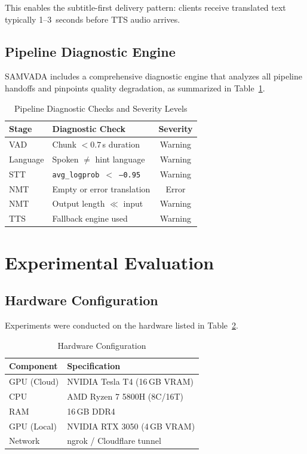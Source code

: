 \documentclass[conference]{IEEEtran}
\begin{document}
This enables the subtitle-first delivery pattern: clients receive translated text typically 1--3~seconds before TTS audio arrives.

\subsection{Pipeline Diagnostic Engine}

SAMVADA includes a comprehensive diagnostic engine that analyzes all pipeline handoffs and pinpoints quality degradation, as summarized in Table~\ref{tab:diagnostics}.

\begin{table}[htbp]
\centering
\caption{Pipeline Diagnostic Checks and Severity Levels}
\label{tab:diagnostics}
\begin{tabular}{llc}
\toprule
\textbf{Stage} & \textbf{Diagnostic Check} & \textbf{Severity} \\
\midrule
VAD & Chunk $< 0.7$\,s duration & Warning \\
Language & Spoken $\neq$ hint language & Warning \\
STT & \texttt{avg\_logprob $<$ --0.95} & Warning \\
NMT & Empty or error translation & Error \\
NMT & Output length $\ll$ input & Warning \\
TTS & Fallback engine used & Warning \\
\bottomrule
\end{tabular}
\end{table}

\section{Experimental Evaluation}
\label{sec:evaluation}

\subsection{Hardware Configuration}

Experiments were conducted on the hardware listed in Table~\ref{tab:hardware}.

\begin{table}[htbp]
\centering
\caption{Hardware Configuration}
\label{tab:hardware}
\begin{tabular}{ll}
\toprule
\textbf{Component} & \textbf{Specification} \\
\midrule
GPU (Cloud) & NVIDIA Tesla T4 (16\,GB VRAM) \\
CPU & AMD Ryzen 7 5800H (8C/16T) \\
RAM & 16\,GB DDR4 \\
GPU (Local) & NVIDIA RTX 3050 (4\,GB VRAM) \\
Network & ngrok / Cloudflare tunnel \\
\bottomrule
\end{tabular}
\end{table}
\end{document}
